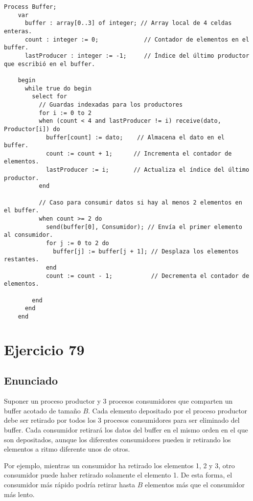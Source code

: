 \documentclass[a4paper,12pt]{article}
\begin{document}
\begin{lstlisting}[style=customcpp, caption={Pseudocódigo del proceso Buffer con guardas indexadas}]
    Process Buffer;
    var
      buffer : array[0..3] of integer; // Array local de 4 celdas enteras.
      count : integer := 0;             // Contador de elementos en el buffer.
      lastProducer : integer := -1;     // Índice del último productor que escribió en el buffer.
    
    begin
      while true do begin
        select for
          // Guardas indexadas para los productores
          for i := 0 to 2
          when (count < 4 and lastProducer != i) receive(dato, Productor[i]) do
            buffer[count] := dato;    // Almacena el dato en el buffer.
            count := count + 1;      // Incrementa el contador de elementos.
            lastProducer := i;       // Actualiza el índice del último productor.
          end
    
          // Caso para consumir datos si hay al menos 2 elementos en el buffer.
          when count >= 2 do
            send(buffer[0], Consumidor); // Envía el primer elemento al consumidor.
            for j := 0 to 2 do
              buffer[j] := buffer[j + 1]; // Desplaza los elementos restantes.
            end
            count := count - 1;           // Decrementa el contador de elementos.
            
        end
      end
    end
\end{lstlisting}

\section{Ejercicio 79}

\subsection{Enunciado}

Suponer un proceso productor y 3 procesos consumidores que comparten un buffer acotado de tamaño \( B \). Cada elemento depositado por el proceso productor debe ser retirado por todos los 3 procesos consumidores para ser eliminado del buffer. Cada consumidor retirará los datos del buffer en el mismo orden en el que son depositados, aunque los diferentes consumidores pueden ir retirando los elementos a ritmo diferente unos de otros. 

Por ejemplo, mientras un consumidor ha retirado los elementos 1, 2 y 3, otro consumidor puede haber retirado solamente el elemento 1. De esta forma, el consumidor más rápido podría retirar hasta \( B \) elementos más que el consumidor más lento. 
\end{document}

